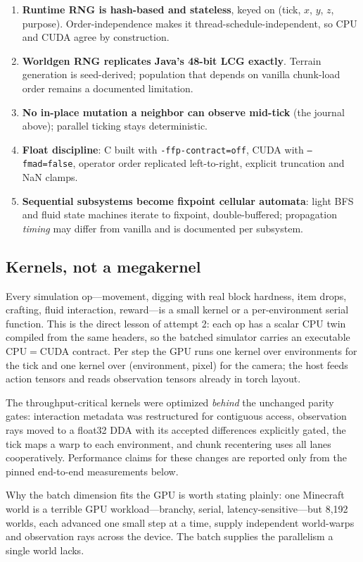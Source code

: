 \documentclass[11pt]{article}
\begin{document}
\begin{enumerate}
\item \textbf{Runtime RNG is hash-based and stateless}, keyed on (tick, $x$, $y$, $z$, purpose). Order-independence makes it thread-schedule-independent, so CPU and CUDA agree by construction.
\item \textbf{Worldgen RNG replicates Java's 48-bit LCG exactly}. Terrain generation is seed-derived; population that depends on vanilla chunk-load order remains a documented limitation.
\item \textbf{No in-place mutation a neighbor can observe mid-tick} (the journal above); parallel ticking stays deterministic.
\item \textbf{Float discipline}: C built with \texttt{-ffp-contract=off}, CUDA with \texttt{--fmad=false}, operator order replicated left-to-right, explicit truncation and NaN clamps.
\item \textbf{Sequential subsystems become fixpoint cellular automata}: light BFS and fluid state machines iterate to fixpoint, double-buffered; propagation \emph{timing} may differ from vanilla and is documented per subsystem.
\end{enumerate}

\subsection{Kernels, not a megakernel}

Every simulation op---movement, digging with real block hardness, item drops, crafting, fluid interaction, reward---is a small kernel or a per-environment serial function. This is the direct lesson of attempt 2: each op has a scalar CPU twin compiled from the same headers, so the batched simulator carries an executable CPU$=$CUDA contract. Per step the GPU runs one kernel over environments for the tick and one kernel over (environment, pixel) for the camera; the host feeds action tensors and reads observation tensors already in torch layout.

The throughput-critical kernels were optimized \emph{behind} the unchanged parity gates: interaction metadata was restructured for contiguous access, observation rays moved to a float32 DDA with its accepted differences explicitly gated, the tick maps a warp to each environment, and chunk recentering uses all lanes cooperatively. Performance claims for these changes are reported only from the pinned end-to-end measurements below.

Why the batch dimension fits the GPU is worth stating plainly: one Minecraft world is a terrible GPU workload---branchy, serial, latency-sensitive---but 8{,}192 worlds, each advanced one small step at a time, supply independent world-warps and observation rays across the device. The batch supplies the parallelism a single world lacks.
\end{document}
